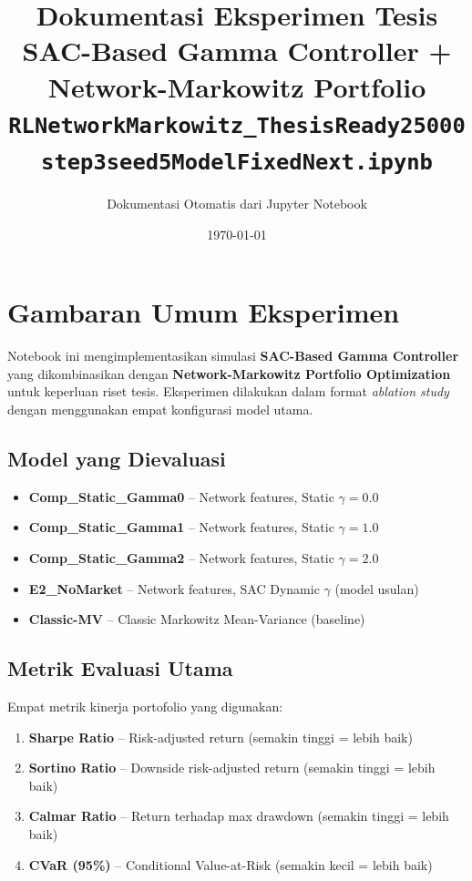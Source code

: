 \documentclass[12pt,a4paper]{article}
\title{%
  \textbf{Dokumentasi Eksperimen Tesis}\\[6pt]
  \large SAC-Based Gamma Controller + Network-Markowitz Portfolio\\[4pt]
  \normalsize\texttt{RLNetworkMarkowitz\_ThesisReady25000step3seed5ModelFixedNext.ipynb}
}
\author{Dokumentasi Otomatis dari Jupyter Notebook}
\date{\today}
\begin{document}
\maketitle
\tableofcontents
\newpage

\section{Gambaran Umum Eksperimen}

Notebook ini mengimplementasikan simulasi \textbf{SAC-Based Gamma Controller} yang dikombinasikan dengan \textbf{Network-Markowitz Portfolio Optimization} untuk keperluan riset tesis. Eksperimen dilakukan dalam format \emph{ablation study} dengan menggunakan empat konfigurasi model utama.

\subsection{Model yang Dievaluasi}

\begin{itemize}[leftmargin=*]
  \item \textbf{Comp\_Static\_Gamma0} -- Network features, Static $\gamma = 0.0$
  \item \textbf{Comp\_Static\_Gamma1} -- Network features, Static $\gamma = 1.0$
  \item \textbf{Comp\_Static\_Gamma2} -- Network features, Static $\gamma = 2.0$
  \item \textbf{E2\_NoMarket} -- Network features, SAC Dynamic $\gamma$ (model usulan)
  \item \textbf{Classic-MV} -- Classic Markowitz Mean-Variance (baseline)
\end{itemize}

\subsection{Metrik Evaluasi Utama}

Empat metrik kinerja portofolio yang digunakan:
\begin{enumerate}
  \item \textbf{Sharpe Ratio} -- Risk-adjusted return (semakin tinggi = lebih baik)
  \item \textbf{Sortino Ratio} -- Downside risk-adjusted return (semakin tinggi = lebih baik)
  \item \textbf{Calmar Ratio} -- Return terhadap max drawdown (semakin tinggi = lebih baik)
  \item \textbf{CVaR (95\%)} -- Conditional Value-at-Risk (semakin kecil = lebih baik)
\end{enumerate}
\end{document}
